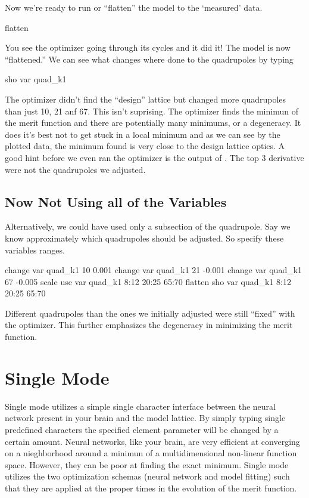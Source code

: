 \documentclass{report}
\begin{document}
Now we're ready to run or ``flatten'' the model to the `measured' data.
\begin{example}
  flatten
\end{example}
You see the optimizer going through its cycles and it did it! The model is now
``flattened.'' We can see what changes where done to the quadrupoles by typing
\begin{example}
  sho var quad\_k1
\end{example}
The optimizer didn't find the ``design'' lattice but changed more quadrupoles
than just 10, 21 anf 67. This isn't suprising. The optimizer finds the minimun
of the merit function and there are potentially many minimums, or a degeneracy.
 It does it's best
not to get stuck in a local minimum and as we can see by the plotted data, the
minimum found is very close to the design lattice optics. A good hint before we
even ran the optimizer is the output of . The top 3
derivative were not the quadrupoles we adjusted.

\section{Now Not Using all of the Variables}
\label{s:fix_it}

Alternatively, we could have used only a subsection of the quadrupole. Say we
know approximately which quadrupoles should be adjusted. So specify these
variables ranges.
\begin{example}
  change var quad\_k1 10 0.001
  change var quad\_k1 21 -0.001
  change var quad\_k1 67 -0.005
  scale
  use var quad\_k1 8:12 20:25 65:70
  flatten
  sho var quad\_k1 8:12 20:25 65:70
\end{example}
Different quadrupoles than the ones we initially adjusted were still ``fixed''
with the optimizer. This further emphasizes the degeneracy in minimizing the
merit function.

\chapter{Single Mode}
\label{c:single_mode}

Single mode utilizes a simple single character interface between the neural 
network present in your brain and the \tao model lattice. By simply typing
single predefined characters the specified element parameter will be changed by
a certain amount. Neural networks, like your brain, are very efficient at
converging on a nieghborhood around a minimun of a multidimensional non-linear
function space. However, they can be poor at finding the exact minimum. Single mode
utilizes the two optimization schemas (neural network and model fitting) such
that they are applied at the proper times in the evolution of the merit
function.
\end{document}
